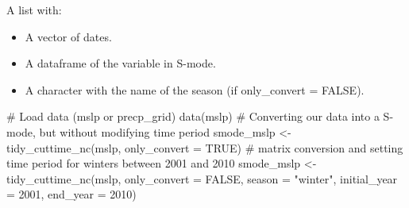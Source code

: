 \documentclass[a4paper]{book}
\begin{document}
%
\begin{Value}
A list with: \begin{itemize}

\item A vector of dates.
\item A dataframe of the variable in S-mode.
\item A character with the name of the season (if only\_convert = FALSE).

\end{itemize}

\end{Value}
%
\begin{SeeAlso}\relax
{}
\end{SeeAlso}
%
\begin{Examples}
\begin{ExampleCode}
# Load data (mslp or precp_grid)
data(mslp)
# Converting our data into a S-mode, but without modifying time period
smode_mslp <- tidy_cuttime_nc(mslp, only_convert = TRUE)
# matrix conversion and setting time period for winters between 2001 and 2010
smode_mslp <- tidy_cuttime_nc(mslp, only_convert = FALSE, season = "winter",
                             initial_year = 2001, end_year = 2010)

\end{ExampleCode}
\end{Examples}
\printindex{}
\end{document}
